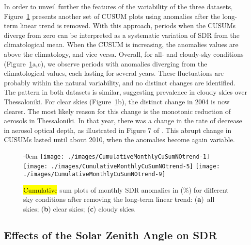 \documentclass[applsci,article,accept,moreauthors,pdftex]{Definitions/mdpi}
\begin{document}
In order to unveil further the features of the variability of the three
datasets, Figure~\ref{fig:cusumnotrendmonthly} presents another set of
CUSUM plots using anomalies after the long-term linear trend is removed.
With this approach, periods when the CUSUMs diverge from zero can be
interpreted as a systematic variation of SDR from the climatological
mean. When the CUSUM is increasing, the anomalies values are above the
climatology, and vice versa. Overall, for all- and cloudy-sky conditions
(Figure~\ref{fig:cusumnotrendmonthly}a,c), we observe periods with anomalies
diverging from the climatological values, each lasting for several
years. These fluctuations are probably within the natural variability,
and no distinct changes are identified. The pattern in both datasets is
similar, suggesting prevalence in cloudy skies over Thessaloniki. For
clear skies (Figure~\ref{fig:cusumnotrendmonthly}b), the distinct change
in 2004 is now clearer. The most likely reason for this change is the
monotonic reduction of aerosols in Thessaloniki. In that year, there was a
change in the rate of decrease in aerosol optical depth, as illustrated
in Figure 7 of \citet{Siomos2020}. This abrupt change in CUSUMs lasted
until about 2010, when the anomalies become again variable.

\begin{figure}[H]
    \begin{adjustwidth}{-\extralength}{0cm}
        {\centering 
                {\texttt{[image: ./images/CumulativeMonthlyCuSumNOtrend-1]} }\hfill
                {\texttt{[image: ./images/CumulativeMonthlyCuSumNOtrend-5]} }\hfill
                {\texttt{[image: ./images/CumulativeMonthlyCuSumNOtrend-9]} }
        }

\end{adjustwidth}
        \caption{\hl{Cumulative} %
 sum plots of monthly SDR anomalies in (\%) for different sky conditions after removing the long-term linear trend: (\textbf{a})~all skies; (\textbf{b}) clear skies; (\textbf{c}) cloudy skies.}\label{fig:cusumnotrendmonthly}
\end{figure}

\hypertarget{effects-of-the-solar-zenith-angle-on-sdr}{%
\subsection{Effects of the Solar Zenith Angle on
SDR}\label{effects-of-the-solar-zenith-angle-on-sdr}}
\end{document}
